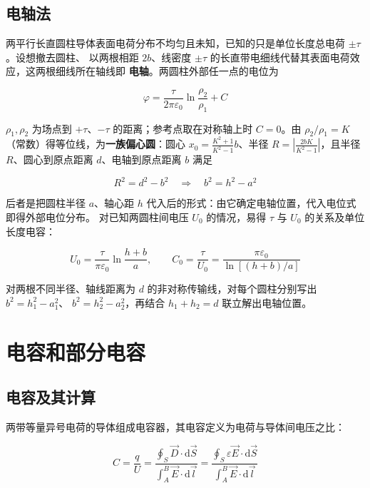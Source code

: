 \subsection{电轴法}

两平行长直圆柱导体表面电荷分布不均匀且未知，已知的只是单位长度总电荷 $\pm\tau$。设想撤去圆柱、
以两根相距 $2b$、线密度 $\pm\tau$ 的长直带电细线代替其表面电荷效应，这两根细线所在轴线即
\textbf{电轴}。两圆柱外部任一点的电位为
\begin{formulaBox}
\[
\varphi=\frac{\tau}{2\pi\varepsilon_0}\ln\frac{\rho_2}{\rho_1}+C
\]
\end{formulaBox}

$\rho_1,\rho_2$ 为场点到 $+\tau$、$-\tau$ 的距离；参考点取在对称轴上时 $C=0$。由 $\rho_2/\rho_1=K$
（常数）得等位线，为\textbf{一族偏心圆}：圆心 $x_0=\frac{K^2+1}{K^2-1}b$、半径
$R=\left|\frac{2bK}{K^2-1}\right|$，且半径 $R$、圆心到原点距离 $d$、电轴到原点距离 $b$ 满足
\begin{formulaBox}
\[
R^2=d^2-b^2
\quad\Longrightarrow\quad
b^2=h^2-a^2
\]
\end{formulaBox}

后者是把圆柱半径 $a$、轴心距 $h$ 代入后的形式：由它确定电轴位置，代入电位式即得外部电位分布。
对已知两圆柱间电压 $U_0$ 的情况，易得 $\tau$ 与 $U_0$ 的关系及单位长度电容：
\begin{formulaBox}
\[
U_0=\frac{\tau}{\pi\varepsilon_0}\ln\frac{h+b}{a},
\qquad
C_0=\frac{\tau}{U_0}=\frac{\pi\varepsilon_0}{\ln\left[(h+b)/a\right]}
\]
\end{formulaBox}

对两根不同半径、轴线距离为 $d$ 的非对称传输线，对每个圆柱分别写出 $b^2=h_1^2-a_1^2$、
$b^2=h_2^2-a_2^2$，再结合 $h_1+h_2=d$ 联立解出电轴位置。


\section{电容和部分电容}

\subsection{电容及其计算}

两带等量异号电荷的导体组成电容器，其电容定义为电荷与导体间电压之比：
\begin{formulaBox}
\[
C=\frac{q}{U}
=\frac{\oint_S\vec{D}\cdot\mathrm{d}\vec{S}}{\int_A^B\vec{E}\cdot\mathrm{d}\vec{l}}
=\frac{\oint_S\varepsilon\vec{E}\cdot\mathrm{d}\vec{S}}{\int_A^B\vec{E}\cdot\mathrm{d}\vec{l}}
\]
\end{formulaBox}

